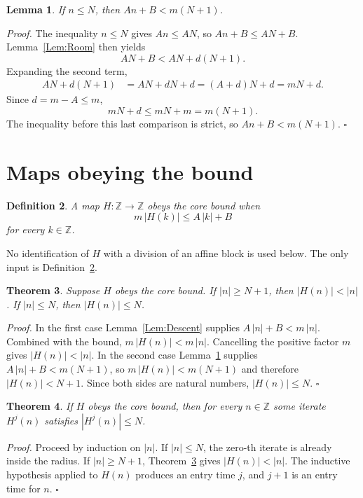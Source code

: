 \documentclass[11pt,letterpaper]{article}
\newcommand{\Z}{\mathbb{Z}}
\newtheorem{theorem}{Theorem}
\newtheorem{lemma}[theorem]{Lemma}
\newtheorem{definition}[theorem]{Definition}
\newenvironment{proof}{\noindent\textit{Proof.}}{\hfill\(\square\)}
\begin{document}
\begin{lemma}\label{Lem:Invariant}
If \(n\le N\), then \(A n+B<m(N+1)\).
\end{lemma}

\begin{proof}
The inequality \(n\le N\) gives \(A n\le A N\), so
\(A n+B\le A N+B\). Lemma~\ref{Lem:Room} then yields
\[
A N+B<A N+d(N+1).
\]
Expanding the second term,
\begin{align*}
A N+d(N+1)
&=A N+d N+d
=(A+d)N+d
=m N+d.
\end{align*}
Since \(d=m-A\le m\),
\[
m N+d\le m N+m=m(N+1).
\]
The inequality before this last comparison is strict, so
\(A n+B<m(N+1)\).
\end{proof}

\section{Maps obeying the bound}

\begin{definition}\label{Def:Bound}
A map \(H\colon\Z\to\Z\) obeys the core bound when
\[
m\,|H(k)|\le A\,|k|+B
\]
for every \(k\in\Z\).
\end{definition}

No identification of \(H\) with a division of an affine block is used below.
The only input is Definition~\ref{Def:Bound}.

\begin{theorem}\label{Thm:Map}
Suppose \(H\) obeys the core bound. If \(|n|\ge N+1\), then
\(|H(n)|<|n|\). If \(|n|\le N\), then \(|H(n)|\le N\).
\end{theorem}

\begin{proof}
In the first case Lemma~\ref{Lem:Descent} supplies
\(A\,|n|+B<m\,|n|\). Combined with the bound,
\(m\,|H(n)|<m\,|n|\). Cancelling the positive factor \(m\) gives
\(|H(n)|<|n|\). In the second case Lemma~\ref{Lem:Invariant} supplies
\(A\,|n|+B<m(N+1)\), so \(m\,|H(n)|<m(N+1)\) and therefore
\(|H(n)|<N+1\). Since both sides are natural numbers,
\(|H(n)|\le N\).
\end{proof}

\begin{theorem}\label{Thm:Entry}
If \(H\) obeys the core bound, then for every \(n\in\Z\) some iterate
\(H^{j}(n)\) satisfies \(|H^{j}(n)|\le N\).
\end{theorem}

\begin{proof}
Proceed by induction on \(|n|\). If \(|n|\le N\), the zero-th iterate is
already inside the radius. If \(|n|\ge N+1\), Theorem~\ref{Thm:Map} gives
\(|H(n)|<|n|\). The inductive hypothesis applied to \(H(n)\) produces an
entry time \(j\), and \(j+1\) is an entry time for \(n\).
\end{proof}
\end{document}
